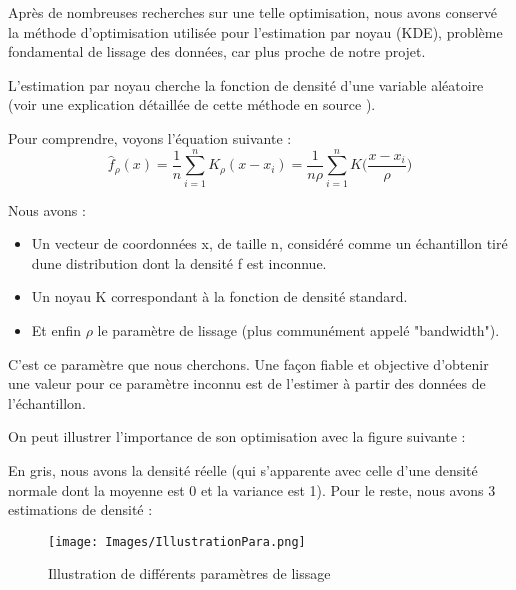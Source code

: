 \documentclass[a4paper,12pt]{article} %
\begin{document}
                Après de nombreuses recherches sur une telle optimisation, nous avons conservé la méthode d'optimisation utilisée pour l'estimation par noyau (KDE), problème fondamental de lissage des données, car plus proche de notre projet. 
                
                L'estimation par noyau cherche la fonction de densité d'une variable aléatoire (voir une explication détaillée de cette méthode en source \cite{Estimation_par_noyau}).
                
                Pour comprendre, voyons l'équation suivante :
                \[{\widehat{f}}_{\rho}(x)={\frac {1}{n}}\sum _{i=1}^{n}K_{\rho}(x-x_{i})={\frac {1}{n\rho}}\sum _{i=1}^{n}K{\Big (}{\frac {x-x_{i}}{\rho}}\Big )\]
                
                 Nous avons :
                 \begin{itemize}
                        \item   Un vecteur de coordonnées x, de taille n, considéré comme un échantillon tiré dune distribution dont la densité f est inconnue.
                        \item 	Un noyau K correspondant à la fonction de densité standard.
                        \item   Et enfin $\rho$ le paramètre de lissage (plus communément appelé "bandwidth").
                \end{itemize}
                
                C'est ce paramètre que nous cherchons. Une façon fiable et objective d’obtenir une valeur pour ce paramètre inconnu est de l'estimer à partir des données de l'échantillon.
                
                On peut illustrer l'importance de son optimisation avec la figure suivante :
                
                En gris, nous avons la densité réelle (qui s'apparente avec celle d'une densité normale dont la moyenne est 0 et la variance est 1). Pour le reste, nous avons 3 estimations de densité :
                
                \begin{figure}[H]
                \begin{center}
                \texttt{[image: Images/IllustrationPara.png]} 
                \end{center}
                \caption{Illustration de différents paramètres de lissage}
                \label{CasNonfonctionnel}
                \end{figure}
                
\end{document}
